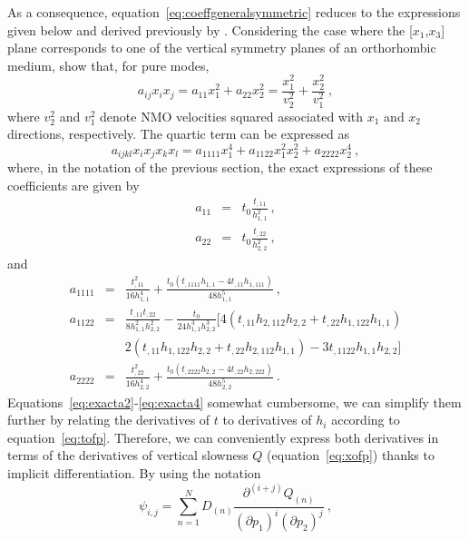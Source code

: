 As a consequence, equation~\ref{eq:coeffgeneralsymmetric} reduces to the expressions given below and derived previously by \cite{alortho}. Considering the case where the [$x_1$,$x_3$] plane corresponds to one of the vertical symmetry planes of an orthorhombic medium, \cite{alortho} show that, for pure modes, 
\begin{equation}
\label{eq:nmo}
a_{ij} x_i x_j = a_{11}x^2_1 + a_{22}x^2_2 = \frac{x^2_1}{v^2_2} + \frac{x^2_2}{v^2_1}~,
\end{equation}
where $v^2_2$ and $v^2_1$ denote NMO velocities squared associated with $x_1$ and $x_2$ directions, respectively. The quartic term can be expressed as 
\begin{equation}
\label{eq:quartic}
a_{ijkl} x_i x_j x_k x_l = a_{1111} x^4_1 + a_{1122} x^2_1 x^2_2 + a_{2222} x^4_2~,
\end{equation}
where, in the notation of the previous section, the exact expressions of these coefficients are given by 
\begin{eqnarray}
\label{eq:exacta2}
a_{11} & = & t_0 \frac{t_{,11}}{h^2_{1,1}}~,\\
a_{22} & = & t_0 \frac{t_{,22}}{h^2_{2,2}}~,
\end{eqnarray}
and
\begin{eqnarray}
a_{1111} & = & \frac{t^2_{,11}}{16 h^4_{1,1}} + \frac{t_0(t_{,1111} h_{1,1}-4 t_{,11} h_{1,111})}{48 h^5_{1,1}}~,\\
\nonumber
a_{1122} & = &  \frac{t_{,11}t_{,22}}{8 h^2_{1,1} h^2_{2,2}} - \frac{t_0}{24 h^3_{1,1} h^3_{2,2}}\bigg[4(t_{,11}h_{2,112}h_{2,2} + t_{,22}h_{1,122}h_{1,1})\\ 
         && 2(t_{,11}h_{1,122}h_{2,2}+t_{,22}h_{2,112}h_{1,1}) - 3t_{,1122}h_{1,1}h_{2,2} \bigg]\\
\label{eq:exacta4}
a_{2222} & = & \frac{t^2_{,22}}{16 h^4_{2,2}} + \frac{t_0(t_{,2222} h_{2,2}-4 t_{,22} h_{2,222})}{48 h^5_{2,2}}~.
\end{eqnarray}
Equations~\ref{eq:exacta2}-\ref{eq:exacta4}  somewhat cumbersome, we can simplify them further by relating the derivatives of $t$ to derivatives of $h_i$ according to equation~\ref{eq:tofp}. Therefore, we can conveniently express both derivatives in terms of the derivatives of vertical slowness $Q$ (equation~\ref{eq:xofp}) thanks to implicit differentiation. By using the notation
\begin{equation}
\label{eq:psi}
\psi_{i,j} = \sum\limits^N_{n=1} D_{(n)} \frac{\partial^{(i+j)} Q_{(n)}}{(\partial p_1)^{i} (\partial p_2)^{j}}~,
\end{equation}
